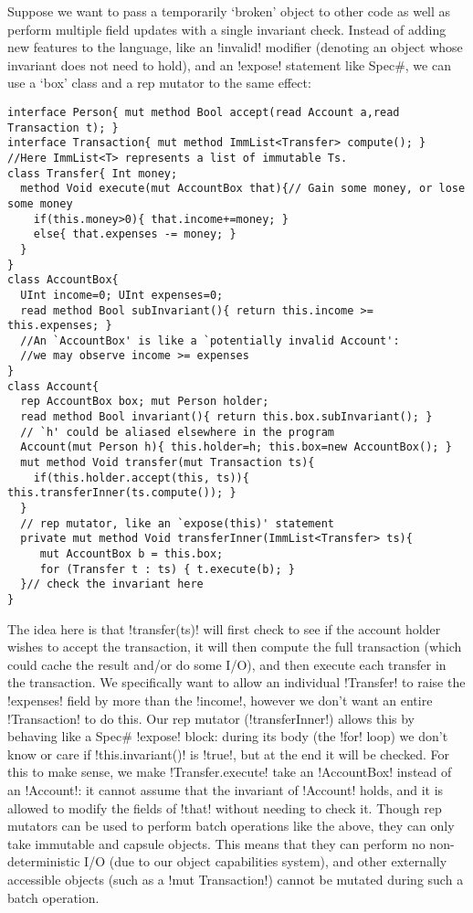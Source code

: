 Suppose we want to pass a temporarily `broken' object to other code as well as perform multiple field updates with a single invariant check. 
Instead of adding new features to the language, like an \Q!invalid! modifier (denoting an object whose invariant does not need to hold), and an \Q!expose! statement like Spec\#, we can use a `box' class and a rep mutator to the same effect:
\begin{lstlisting}
interface Person{ mut method Bool accept(read Account a,read Transaction t); }
interface Transaction{ mut method ImmList<Transfer> compute(); }
//Here ImmList<T> represents a list of immutable Ts.
class Transfer{ Int money;
  method Void execute(mut AccountBox that){// Gain some money, or lose some money
    if(this.money>0){ that.income+=money; }
    else{ that.expenses -= money; }
  }
}
class AccountBox{
  UInt income=0; UInt expenses=0;
  read method Bool subInvariant(){ return this.income >= this.expenses; }
  //An `AccountBox' is like a `potentially invalid Account':
  //we may observe income >= expenses
}
class Account{
  rep AccountBox box; mut Person holder;
  read method Bool invariant(){ return this.box.subInvariant(); }
  // `h' could be aliased elsewhere in the program
  Account(mut Person h){ this.holder=h; this.box=new AccountBox(); }
  mut method Void transfer(mut Transaction ts){
    if(this.holder.accept(this, ts)){ this.transferInner(ts.compute()); }
  }
  // rep mutator, like an `expose(this)' statement
  private mut method Void transferInner(ImmList<Transfer> ts){
     mut AccountBox b = this.box;
     for (Transfer t : ts) { t.execute(b); }
  }// check the invariant here
}
\end{lstlisting}
The idea here is that \Q!transfer(ts)! will first check to see if the account holder wishes to accept the transaction, it will then compute the full transaction (which could cache the result and/or do some I/O), and then execute each transfer in the transaction. We specifically want to allow an individual \Q!Transfer! to raise the \Q!expenses! field by more than the \Q!income!, however we don't want an entire \Q!Transaction! to do this. 
Our rep mutator (\Q!transferInner!) allows this by behaving like a Spec\# \Q!expose! block: during its body (the \Q!for! loop) we don't know or care if \Q!this.invariant()! is \Q!true!, but at the end it will be checked. For this to make sense, we make \Q!Transfer.execute! take an \Q!AccountBox! instead of an \Q!Account!: it cannot assume that the invariant of \Q!Account! holds, and it is allowed to modify the fields of \Q!that! without needing to check it. Though rep mutators can be used to perform batch operations like the above, they can only take immutable and capsule objects. This means that they can perform no non-deterministic I/O (due to our object capabilities system), and other externally accessible objects (such as a \Q!mut Transaction!) cannot be mutated during such a batch operation.

